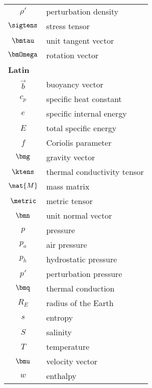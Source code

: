 \begin{center}
\begin{longtable}{cl}
$\rho'$      & perturbation density\\
$\sigtens$   & stress tensor\\
$\bmtau$     & unit tangent vector\\
$\bmOmega$   & rotation vector\\
\hline
%
\multicolumn{2}{l}{{\bf Latin}} \\ \hline
%
$\vec{b}$      & buoyancy vector\\
$c_p$       & specific heat constant\\
$e$         & specific internal energy\\
$E$         & total specific energy\\
$f$         & Coriolis parameter\\
$\bmg$      & gravity vector\\
$\ktens$    & thermal conductivity tensor\\
$\mat{M}$   & mass matrix\\
$\metric$   & metric tensor\\
$\bmn$      & unit normal vector\\
$p$         & pressure\\
$p_a$       & air pressure\\
$p_h$       & hydrostatic pressure\\
$p'$        & perturbation pressure\\
$\bmq$      & thermal conduction\\
$R_E$       & radius of the Earth\\
$s$         & entropy\\
$S$         & salinity\\
$T$         & temperature\\
$\bmu$      & velocity vector\\
$w$         & enthalpy\\


\end{longtable}
\end{center}
